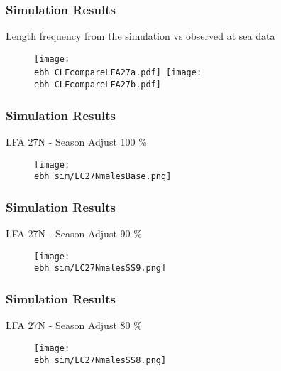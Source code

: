 \documentclass{beamer}
\newcommand{\ebh}{\string~/bio.data/bio.lobster/figures/LFA2733Framework2018/} %
\begin{document}
\begin{frame}
\frametitle{Simulation Results}
Length frequency from the simulation vs observed at sea data
\begin{figure}
        \begin{center}
               \texttt{[image: \\ebh CLFcompareLFA27a.pdf]}\
               \texttt{[image: \\ebh CLFcompareLFA27b.pdf]}\\
        \end{center}
    \end{figure}
\end{frame}




\begin{frame}
\frametitle{Simulation Results}
LFA 27N - Season Adjust 100 \%
\begin{figure}
        \begin{center}
            \texttt{[image: \\ebh sim/LC27NmalesBase.png]}
        \end{center}
    \end{figure}
\end{frame}


\begin{frame}
\frametitle{Simulation Results}
LFA 27N - Season Adjust 90 \%
\begin{figure}
        \begin{center}
            \texttt{[image: \\ebh sim/LC27NmalesSS9.png]}
        \end{center}
    \end{figure}
\end{frame}


\begin{frame}
\frametitle{Simulation Results}
LFA 27N - Season Adjust 80 \%
\begin{figure}
        \begin{center}
            \texttt{[image: \\ebh sim/LC27NmalesSS8.png]}
        \end{center}
    \end{figure}
\end{frame}
\end{document}
